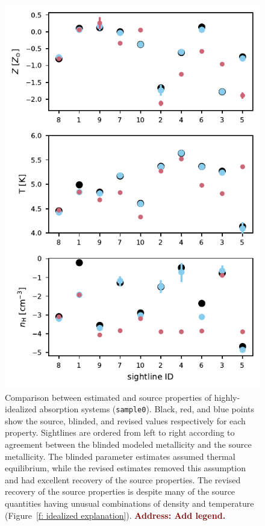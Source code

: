 \documentclass[fleqn,usenatbib]{mnras}
\newcommand{\todo}[1]{\textcolor{Maroon}{\textbf{Address: #1}}}
\begin{document}
\begin{figure}
    \centering
    \includegraphics[width=\columnwidth]{figures/sample0/comparison.pdf}
    \caption{
    Comparison between estimated and source properties of highly-idealized absorption systems (\texttt{sample0}).
        Black, red, and blue points show the source, blinded, and revised values respectively for each property.
    Sightlines are ordered from left to right according to agreement between the blinded modeled metallicity and the source metallicity.
   The blinded parameter estimates assumed thermal equilibrium,
   while the revised estimates removed this assumption and had excellent recovery of the source properties.
   The revised recovery of the source properties is despite many of the source quantities having unusual combinations of density and temperature (Figure~\ref{f: idealized explanation}).
   \todo{Add legend.}
    }
    \label{f: idealized}
\end{figure}
\end{document}
